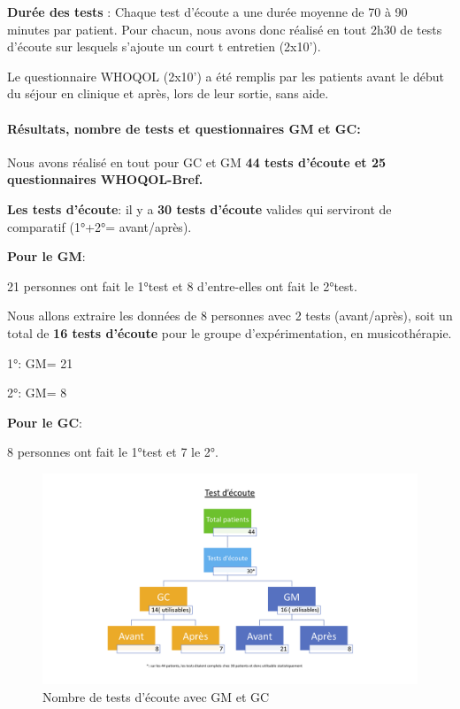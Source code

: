	
	
	\textbf{Durée des tests} : Chaque test d'écoute a une durée  moyenne de
        70 à 90 minutes par patient. Pour chacun, nous avons donc réalisé
        en tout 2h30 de tests d'écoute sur lesquels
        s'ajoute un court 
t        entretien (2x10').

        
        Le questionnaire WHOQOL (2x10')  a été remplis par les
        patients avant le début du séjour en clinique et après, lors
        de leur sortie, sans aide.
        
       





        
      \paragraph{Résultats, nombre de tests et questionnaires GM et GC:}

       
     Nous avons réalisé en tout pour GC et GM \textbf{44 tests d'écoute et 25 questionnaires 
     WHOQOL-Bref.}
     
     \textbf{Les tests d'écoute}: il y a\textbf{ 30 tests d'écoute } valides qui serviront de
     comparatif (1°+2°= avant/après).



     
\textbf{Pour le GM}:
     
     21 personnes ont fait le 1°test et 8 d'entre-elles ont fait le
     2°test.

     Nous allons extraire les données de 8 personnes avec 2 tests (avant/après), soit  un
     total de \textbf{16 tests d'écoute } pour le groupe
     d'expérimentation, en musicothérapie.

     
     1°: GM= 21
    
     2°: GM= 8
     
     \textbf{ Pour le GC}:

     
     8 personnes ont fait le 1°test et 7 le 2°.


     
   \begin{figure}
\centering
\includegraphics[width=1\linewidth]{images/graphiques/test_ecoute.jpg}
\caption[Schéma du déroulement]{Nombre de tests d'écoute avec GM et GC}
       
\label{groupecontroleimage1}
\end{figure}
  
